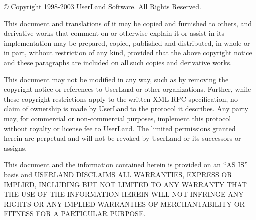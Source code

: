 {\copyright} Copyright 1998-2003 UserLand Software. All Rights Reserved.

This document and translations of it may be copied and furnished to others, and derivative works that comment on or otherwise explain it or assist in its implementation may be prepared, copied, published and distributed, in whole or in part, without restriction of any kind, provided that the above copyright notice and these paragraphs are included on all such copies and derivative works.

This document may not be modified in any way, such as by removing the copyright notice or references to UserLand or other organizations. Further, while these copyright restrictions apply to the written XML-RPC specification, no claim of ownership is made by UserLand to the protocol it describes. Any party may, for commercial or non-commercial purposes, implement this protocol without royalty or license fee to UserLand. The limited permissions granted herein are perpetual and will not be revoked by UserLand or its successors or assigns.

This document and the information contained herein is provided on an ``AS IS'' basis and USERLAND DISCLAIMS ALL WARRANTIES, EXPRESS OR IMPLIED, INCLUDING BUT NOT LIMITED TO ANY WARRANTY THAT THE USE OF THE INFORMATION HEREIN WILL NOT INFRINGE ANY RIGHTS OR ANY IMPLIED WARRANTIES OF MERCHANTABILITY OR FITNESS FOR A PARTICULAR PURPOSE.



